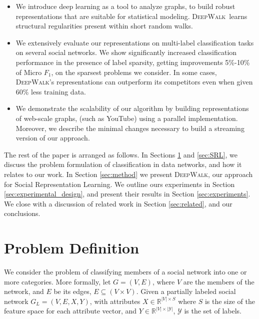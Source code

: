 \documentclass{sig-alternate}
\newcommand{\ouralgorithm}{\textsc{DeepWalk}}
\begin{document}
\begin{itemize}

\item We introduce deep learning as a tool to analyze graphs, to build robust representations that are suitable for statistical modeling. \ouralgorithm\ learns structural regularities present within short random walks.

\item We extensively evaluate our representations on multi-label classification tasks on several social networks.
We show significantly increased classification performance in the presence of label sparsity, getting improvements 5\%-10\% of Micro $F_1$, on the sparsest problems we consider.
In some cases, \ouralgorithm's representations can outperform its competitors even when given 60\% less training data.

\item We demonstrate the scalability of our algorithm by building representations of web-scale graphs, (such as YouTube) using a parallel implementation.
Moreover, we describe the minimal changes necessary to build a streaming version of our approach.

\end{itemize}

The rest of the paper is arranged as follows.  In Sections \ref{sec:problem} and \ref{sec:SRL}, we discuss the problem formulation of classification in data networks, and how it relates to our work.  In Section \ref{sec:method} we present \ouralgorithm, our approach for Social Representation Learning.  We outline ours experiments in Section \ref{sec:experimental_design}, and present their results in Section \ref{sec:experiments}.  We close with a discussion of related work in Section \ref{sec:related}, and our conclusions.


\section{Problem Definition}
\label{sec:problem}

We consider the problem of classifying members of a social network into one or more categories.  
More formally, let $G=(V, E)$, where $V$ are the members of the network, and $E$ be its edges, $E \subseteq (V \times V)$.
Given a partially labeled social network $G_L = (V,E,X,Y)$, with attributes $X \in \mathbb{R}^{|V|\times S}$ where $S$ is the size of the feature space for each attribute vector, and $Y \in \mathbb{R}^{|V|\times |\mathcal{Y}|}$, $\mathcal{Y}$ is the set of labels.
\end{document}
